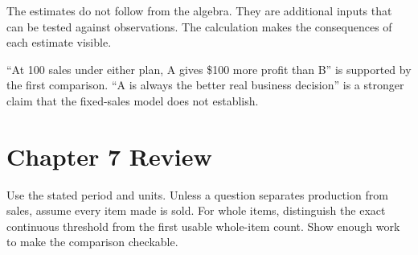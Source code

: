 \documentclass[11pt,letterpaper]{article}
\begin{document}
The estimates do not follow from the algebra. They are additional inputs that can be tested against observations. The calculation makes the consequences of each estimate visible.

\begin{tcolorbox}[title={A conclusion with its conditions}]
``At 100 sales under either plan, A gives \$100 more profit than B'' is supported by the first comparison. ``A is always the better real business decision'' is a stronger claim that the fixed-sales model does not establish.
\end{tcolorbox}

\clearpage
\section*{Chapter 7 Review}
Use the stated period and units. Unless a question separates production from sales, assume every item made is sold. For whole items, distinguish the exact continuous threshold from the first usable whole-item count. Show enough work to make the comparison checkable.
\end{document}
